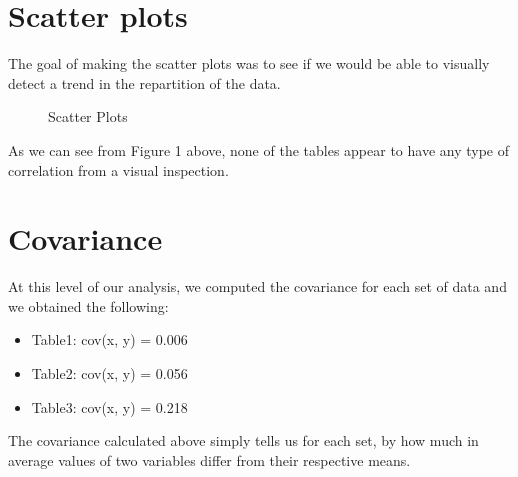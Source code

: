 \documentclass[12pt]{article}
\begin{document}
	\section{Scatter plots}
		The goal of making the scatter plots was to see if we would be able to visually detect a trend in the repartition of the data.		
		\begin{figure}[H]
			\hfill
			\hfill
			\hfill
			\centering
			\hfill
			\caption{Scatter Plots}
		\end{figure}  
		As we can see from Figure 1 above, none of the tables appear to have any type of correlation from a visual inspection.
	\section{Covariance}
		At this level of our analysis, we computed the covariance for each set of data and we obtained the following:
		\begin{itemize}
			\item Table1: cov(x, y) = 0.006
			\item Table2: cov(x, y) = 0.056
			\item Table3: cov(x, y) = 0.218
		\end{itemize}
		The covariance calculated above simply tells us for each set, by how much in average values of two variables differ from their respective means. 
\end{document}
